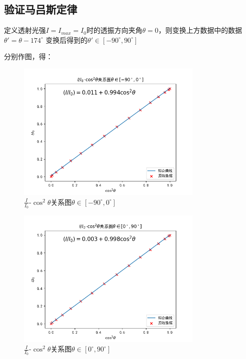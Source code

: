 \documentclass[a4paper,UTF8]{ctexart}
\begin{document}
\subsection{验证马吕斯定律}

定义透射光强$I=I_{max}=I_0$时的透振方向夹角$\theta = 0$，则变换上方数据中的数据$\theta' = \theta - 174^\circ$
变换后得到的$\theta' \in \left[-90^\circ,90^\circ\right]$

分别作图，得：

\begin{figure}[H]
    \centering
    \includegraphics[width=0.8\textwidth]{n.png}
    \caption{$\frac{I}{I_0}$-$\cos^2{\theta}$关系图$\theta \in \left[-90^\circ,0^\circ\right]$}
\end{figure}

\begin{figure}[H]
    \centering
    \includegraphics[width=0.8\textwidth]{p.png}
    \caption{$\frac{I}{I_0}$-$\cos^2{\theta}$关系图$\theta \in \left[0^\circ,90^\circ\right]$}
\end{figure}
\end{document}
